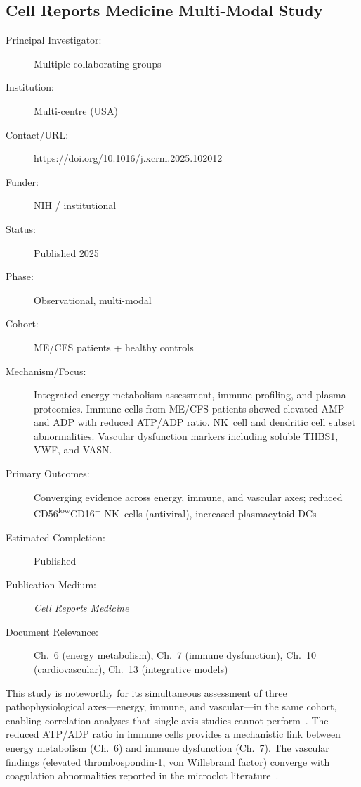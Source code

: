\subsection{Cell Reports Medicine Multi-Modal Study}
\label{sec:registry-cell-reports-medicine}

\begin{description}
    \item[Principal Investigator:] Multiple collaborating groups
    \item[Institution:] Multi-centre (USA)
    \item[Contact/URL:] \url{https://doi.org/10.1016/j.xcrm.2025.102012}
    \item[Funder:] NIH / institutional
    \item[Status:] Published 2025
    \item[Phase:] Observational, multi-modal
    \item[Cohort:] ME/CFS patients + healthy controls
    \item[Mechanism/Focus:] Integrated energy metabolism assessment, immune
        profiling, and plasma proteomics.  Immune cells from ME/CFS patients
        showed elevated AMP and ADP with reduced ATP/ADP ratio.  NK~cell and
        dendritic cell subset abnormalities.  Vascular dysfunction markers
        including soluble THBS1, VWF, and VASN.
    \item[Primary Outcomes:] Converging evidence across energy, immune, and
        vascular axes; reduced CD56\textsuperscript{low}CD16\textsuperscript{+}
        NK~cells (antiviral), increased plasmacytoid DCs
    \item[Estimated Completion:] Published
    \item[Publication Medium:] \textit{Cell Reports Medicine}
    \item[Document Relevance:] Ch.~6 (energy metabolism), Ch.~7 (immune
        dysfunction), Ch.~10 (cardiovascular), Ch.~13 (integrative models)
\end{description}

This study is noteworthy for its simultaneous assessment of three
pathophysiological axes---energy, immune, and vascular---in the same cohort,
enabling correlation analyses that single-axis studies cannot
perform~\cite{CellReportsMedicine2025MECFS}.  The reduced ATP/ADP ratio in
immune cells provides a mechanistic link between energy metabolism (Ch.~6) and
immune dysfunction (Ch.~7).  The vascular findings (elevated thrombospondin-1,
von Willebrand factor) converge with coagulation abnormalities reported in the
microclot literature~\cite{Nunes2022microclots}.

